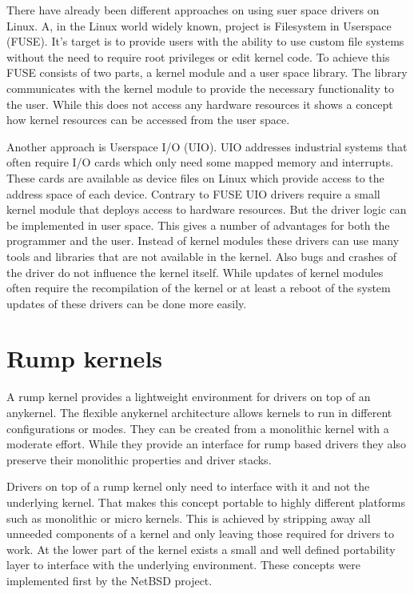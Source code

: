 \documentclass[
a4paper,
12pt,
notitlepage,
parskip=half,
DIV=11,
]{scrbook}
\begin{document}
		There have already been different approaches on using suer space drivers on Linux.
		A, in the Linux world widely known, project is Filesystem in Userspace (FUSE).
		It's target is to provide users with the ability to use custom file systems without the need to require root privileges or edit kernel code.
		To achieve this FUSE consists of two parts, a kernel module and a user space library.
		The library communicates with the kernel module to provide the necessary functionality to the user.
		While this does not access any hardware resources it shows a concept how kernel resources can be accessed from the user space. \citep{fuse}
		
		Another approach is Userspace I/O (UIO).
		UIO addresses industrial systems that often require I/O cards which only need some mapped memory and interrupts.
		These cards are available as device files on Linux which provide access to the address space of each device.
		Contrary to FUSE UIO drivers require a small kernel module that deploys access to hardware resources.
		But the driver logic can be implemented in user space.
		This gives a number of advantages for both the programmer and the user.
		Instead of kernel modules these drivers can use many tools and libraries that are not available in the kernel.
		Also bugs and crashes of the driver do not influence the kernel itself.
		While updates of kernel modules often require the recompilation of the kernel or at least a reboot of the system updates of these drivers can be done more easily. \citep{uio}
		
		\section{Rump kernels}
		
		A rump kernel provides a lightweight environment for drivers on top of an anykernel.
		The flexible anykernel architecture allows kernels to run in different configurations or modes.
		They can be created from a monolithic kernel with a moderate effort.
		While they provide an interface for rump based drivers they also preserve their monolithic properties and driver stacks. \citep{kantee}
		
		Drivers on top of a rump kernel only need to interface with it and not the underlying kernel.
		That makes this concept portable to highly different platforms such as monolithic or micro kernels.
		This is achieved by stripping away all unneeded components of a kernel and only leaving those required for drivers to work.
		At the lower part of the kernel exists a small and well defined portability layer to interface with the underlying environment.
		These concepts were implemented first by the NetBSD project. \citep{bsd_rump}\citep{fosdem_rump}\citep{rump}
		
\end{document}
